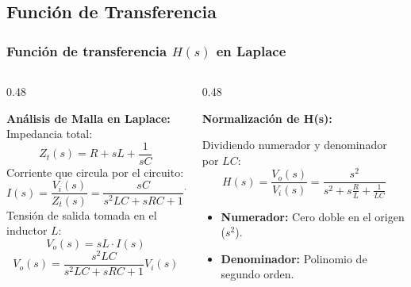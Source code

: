 \subsection{Función de Transferencia}
\begin{frame}
  \frametitle{Función de transferencia $H(s)$ en Laplace}

  \begin{columns}[t, onlytextwidth]
    \begin{column}{0.48\textwidth}
      \begin{tarjeta}
        {\fontsize{9pt}{11pt}\selectfont \textbf{\color{NavyDark} Análisis de Malla en Laplace:}}\\[2pt]
        {\fontsize{8pt}{10pt}\selectfont
        Impedancia total:
        \[ Z_t(s) = R + sL + \frac{1}{sC} \]
        Corriente que circula por el circuito:
        \[ I(s) = \frac{V_i(s)}{Z_t(s)} = \frac{sC}{s^2 LC + sR C + 1} V_i(s) \]
        Tensión de salida tomada en el inductor $L$:
        \[ V_o(s) = sL \cdot I(s) \]
        \[ V_o(s) = \frac{s^2LC}{s^2 LC + sR C + 1} V_i(s) \]
        }
      \end{tarjeta}
    \end{column}

    \begin{column}{0.48\textwidth}
      \begin{tarjeta}
        {\fontsize{9pt}{11pt}\selectfont \textbf{\color{NavyDark} Normalización de H(s):}}\\[2pt]
        {\fontsize{8pt}{10pt}\selectfont
        Dividiendo numerador y denominador por $LC$:
        \[ H(s) = \frac{V_o(s)}{V_i(s)} = \frac{s^2}{s^2 + s \frac{R}{L} + \frac{1}{LC}} \]
        \begin{itemize}\setlength{\itemsep}{2pt}
          \item \textbf{Numerador:} Cero doble en el origen ($s^2$).
          \item \textbf{Denominador:} Polinomio de segundo orden.
        \end{itemize}
        }
      \end{tarjeta}
    \end{column}
  \end{columns}
\end{frame}

